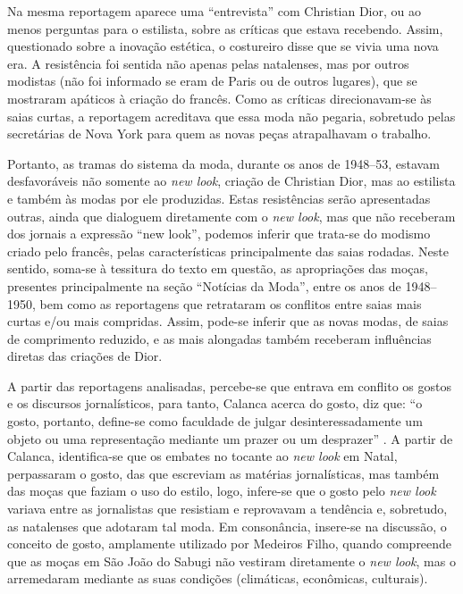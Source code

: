 \begin{refsection}
    Na mesma reportagem aparece uma ``entrevista'' com Christian Dior, ou ao menos perguntas para o estilista, sobre as críticas que estava recebendo. Assim, questionado sobre a inovação estética, o costureiro disse que se vivia uma nova era. A resistência foi sentida não apenas pelas natalenses, mas por outros modistas (não foi informado se eram de Paris ou de outros lugares), que se mostraram apáticos à criação do francês. Como as críticas direcionavam-se às saias curtas, a reportagem acreditava que essa moda não pegaria, sobretudo pelas secretárias de Nova York para quem as novas peças atrapalhavam o trabalho.  

    Portanto, as tramas do sistema da moda, durante os anos de 1948--53, estavam desfavoráveis não somente ao \textit{new look}, criação de Christian Dior, mas ao estilista e também às modas por ele produzidas. Estas resistências serão apresentadas outras, ainda que dialoguem diretamente com o \textit{new look}, mas que não receberam dos jornais a expressão ``new look'', podemos inferir que trata-se do modismo criado pelo francês, pelas características principalmente das saias rodadas. Neste sentido, soma-se à tessitura do texto em questão, as apropriações das moças, presentes principalmente na seção ``Notícias da Moda'', entre os anos de 1948--1950, bem como as reportagens que retrataram os conflitos entre saias mais curtas e/ou mais compridas. Assim, pode-se inferir que as novas modas, de saias de comprimento reduzido, e as mais alongadas também receberam influências diretas das criações de Dior.  

    A partir das reportagens analisadas, percebe-se que entrava em conflito os gostos e os discursos jornalísticos, para tanto, Calanca acerca do gosto, diz que: ``o gosto, portanto, define-se como faculdade de julgar desinteressadamente um objeto ou uma representação mediante um prazer ou um desprazer'' \cite[p.~93]{Calanca2008Historia}. A partir de Calanca, identifica-se que os embates no tocante ao \textit{new look} em Natal, perpassaram o gosto, das que escreviam as matérias jornalísticas, mas também das moças que faziam o uso do estilo, logo, infere-se que o gosto pelo \textit{new look} variava entre as jornalistas que resistiam e reprovavam a tendência e, sobretudo, as natalenses que adotaram tal moda. Em consonância, insere-se na discussão, o conceito de gosto, amplamente utilizado por Medeiros Filho, quando compreende que as moças em São João do Sabugi não vestiram diretamente o \textit{new look}, mas o arremedaram mediante as suas condições (climáticas, econômicas, culturais).


\end{refsection}
